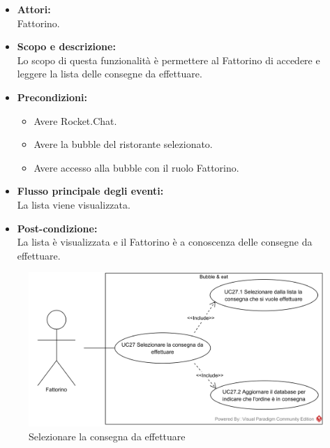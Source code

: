 
\begin{itemize}
	\item \textbf{Attori:}
	\\Fattorino.
	\item \textbf{Scopo e descrizione:} 
	\\Lo scopo di questa funzionalità è permettere al Fattorino di accedere e leggere la lista delle consegne da effettuare.
	\item \textbf{Precondizioni:}
	\begin{itemize}
		\item Avere Rocket.Chat.
		\item Avere la bubble del ristorante selezionato.
		\item Avere accesso alla bubble con il ruolo Fattorino.
	\end{itemize}
	\item \textbf{Flusso principale degli eventi:}
	\\La lista viene visualizzata.
	\item \textbf{Post-condizione:}
	\\La lista è visualizzata e il Fattorino è a conoscenza delle consegne da effettuare.
\end{itemize}


\begin{figure}[H]
	\centering
	\includegraphics[width=15cm]{../../documenti/AnalisiDeiRequisiti/Diagrammi_img/usecase/uc3_10.png}
	\caption{\UCCaption{} Selezionare la consegna da effettuare}
\end{figure}

